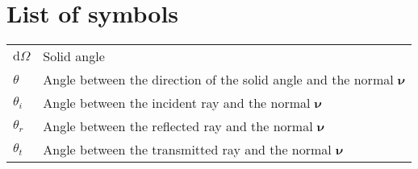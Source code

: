 
\newcommand{\set}[3]{\emph{#1}_{\textit{#2#3}}}
\newcommand{\map}[3]{\mathrm{#1}_{\textit{#2#3}}}
\newcommand{\setbound}[4]{\emph{#1}_{\textit{#2#3}}^{#4}}
\newcommand{\variabile}[1]{\textit{#1}}
\newcommand{\inversemap}[3]{\mathrm{#1}_{\textit{#2#3}}^{-1}}
\newcommand{\vect}[1]{\textit{\textbf{#1}}}
\newcommand{\point}[1]{\textsf{#1}}
\newcommand{\scalar}[2]{(#1 #2)}
\newcommand{\const}[1]{\textrm{#1}}
\newcommand{\myangle}{$\theta$}
\newcommand{\mytime}{T}
\newcommand{\mynormal}{$\boldsymbol{\nu}$}

\chapter*{List of symbols}


\begin{tabular}{l l}

$\textrm{d}{\Omega}$ & {Solid angle}\\
\myangle& {Angle between the direction of the solid angle and the normal $\boldsymbol{\nu}$}\\
\myangle$_i$& {Angle between the incident ray and the normal \mynormal}\\
\myangle$_r$ &{Angle between the reflected ray and the normal \mynormal}\\
\myangle$_t$ & {Angle between the transmitted ray and the normal \mynormal}\\

\end{tabular}

%